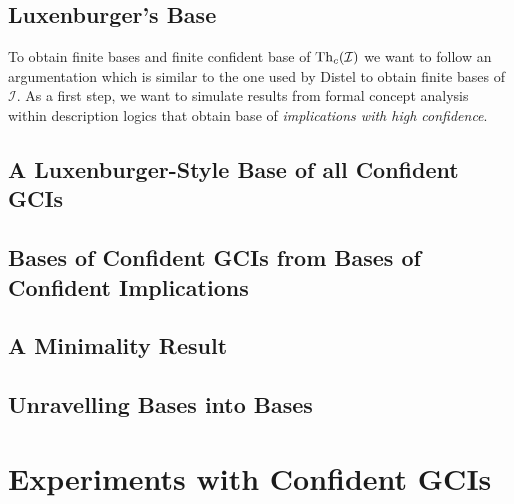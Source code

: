 \subsection{Luxenburger's Base}
\label{Luxen-base}

To obtain finite bases and finite confident base of $\operatorname{Th}_c(\mathcal{I})$ we want to follow
an argumentation which is similar to the one used by Distel to obtain finite bases of
$\mathcal{I}$.  As a first step, we want to simulate results from formal concept analysis
within description logics that obtain base of \emph{implications with high confidence}.

%
%

\subsection{A Luxenburger-Style Base of all Confident GCIs}
\label{sec:first-base}

%
%

\subsection{Bases of Confident GCIs from Bases of Confident Implications}
\label{sec:bases-confident-gcis}

%

\subsection{A Minimality Result}
\label{sec:minimality-result}


\subsection{Unravelling \ELgfpbot Bases into \ELbot Bases}
\label{sec:unrav-elgfpb-bases}

%
%

\section{Experiments with Confident GCIs}
\label{sec:exper-with-conf}

%


